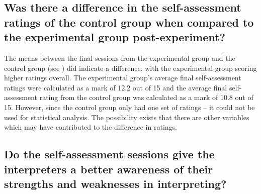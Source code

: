 \documentclass[output=paper]{langsci/langscibook}
\begin{document}
\subsection{Was there a difference in the self-assessment ratings of the control group when compared to the experimental group post-experiment?}

The means between the final sessions from the experimental group and the control group (see ) did indicate a difference, with the experimental group scoring higher ratings overall. The experimental group’s average final self-assessment ratings were calculated as a mark of 12.2 out of 15 and the average final self-assessment rating from the control group was calculated as a mark of 10.8 out of 15. However, since the control group only had one set of ratings – it could not be used for statistical analysis. The possibility exists that there are other variables which may have contributed to the difference in ratings. 

\begin{table}
\caption{\label{tab:deysel:6}Comparison of ratings for experimental and control group}
\end{table}

\subsection{Do the self-assessment sessions give the interpreters a better awareness of their strengths and weaknesses in interpreting?}
\end{document}
